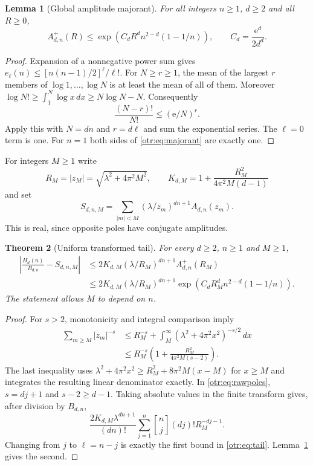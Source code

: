 \documentclass[11pt,a4paper]{article}
\newtheorem{theorem}{Theorem}[section]
\newtheorem{lemma}[theorem]{Lemma}
\theoremstyle{definition}\newtheorem{definition}[theorem]{Definition}
\theoremstyle{remark}\newtheorem{remark}[theorem]{Remark}
\newcommand{\lam}{\lambda}
\newcommand{\e}{\mathrm e}
\newcommand{\St}[2]{\genfrac{[}{]}{0pt}{}{#1}{#2}}
\begin{document}
\begin{lemma}[Global amplitude majorant]\label{otr:lem:majorant}
For all integers $n\ge1$, $d\ge2$ and all $R\ge0$,
\begin{equation}\label{otr:eq:majorant}
 A^+_{d,n}(R)\le\exp\!\left(C_dR^dn^{2-d}(1-1/n)\right),
 \qquad C_d=\frac{\e^d}{2d^d}.
\end{equation}
\end{lemma}
\begin{proof}
Expansion of a nonnegative power sum gives
$e_\ell(n)\le[n(n-1)/2]^\ell/\ell!$. For $N\ge r\ge1$, the mean of the largest $r$ members of $\log1,\ldots,\log N$ is at least the mean of all of them. Moreover
$\log N!\ge\int_1^N\log x\,dx\ge N\log N-N$.
Consequently
\[
 \frac{(N-r)!}{N!}\le(\e/N)^r.
\]
Apply this with $N=dn$ and $r=d\ell$ and sum the exponential series. The $\ell=0$ term is one. For $n=1$ both sides of \eqref{otr:eq:majorant} are exactly one.
\end{proof}

For integers $M\ge1$ write
\begin{equation}\label{otr:eq:RM}
 R_M=|z_M|=\sqrt{\lam^2+4\pi^2M^2},\qquad
 K_{d,M}=1+\frac{R_M^2}{4\pi^2M(d-1)}
\end{equation}
and set
\[
 S_{d,n,M}=\sum_{|m|<M}(\lam/z_m)^{dn+1}A_{d,n}(z_m).
\]
This is real, since opposite poles have conjugate amplitudes.

\begin{theorem}[Uniform transformed tail]\label{otr:thm:tail}
For every $d\ge2$, $n\ge1$ and $M\ge1$,
\begin{align}
 \left|\frac{H_d(n)}{B_{d,n}}-S_{d,n,M}\right|
 &\le2K_{d,M}(\lam/R_M)^{dn+1}A^+_{d,n}(R_M)\label{otr:eq:tail}\\
 &\le2K_{d,M}(\lam/R_M)^{dn+1}
       \exp\!\left(C_dR_M^dn^{2-d}(1-1/n)\right).\nonumber
\end{align}
The statement allows $M$ to depend on $n$.
\end{theorem}
\begin{proof}
For $s>2$, monotonicity and integral comparison imply
\begin{align*}
 \sum_{m\ge M}|z_m|^{-s}
 &\le R_M^{-s}+\int_M^\infty(\lam^2+4\pi^2x^2)^{-s/2}\,dx\\
 &\le R_M^{-s}\left(1+\frac{R_M^2}{4\pi^2M(s-2)}\right).
\end{align*}
The last inequality uses
$\lam^2+4\pi^2x^2\ge R_M^2+8\pi^2M(x-M)$ for $x\ge M$ and integrates the resulting linear denominator exactly. In \eqref{otr:eq:rawpoles}, $s=dj+1$ and $s-2\ge d-1$. Taking absolute values in the finite transform gives, after division by $B_{d,n}$,
\[
 \frac{2K_{d,M}\lam^{dn+1}}{(dn)!}
       \sum_{j=1}^n\St nj(dj)!R_M^{-dj-1}.
\]
Changing from $j$ to $\ell=n-j$ is exactly the first bound in \eqref{otr:eq:tail}. Lemma~\ref{otr:lem:majorant} gives the second.
\end{proof}
\end{document}
